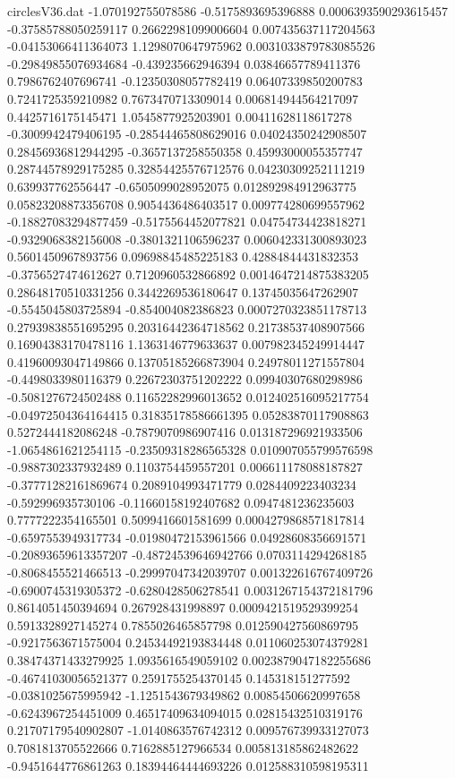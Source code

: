 \begin{filecontents}{circlesV36.dat}
-1.070192755078586	-0.5175893695396888	0.0006393590293615457
-0.37585788050259117	0.26622981099006604	0.007435637117204563
-0.04153066411364073	1.1298070647975962	0.0031033879783085526
-0.29849855076934684	-0.439235662946394	0.03846657789411376
0.7986762407696741	-0.12350308057782419	0.06407339850200783
0.7241725359210982	0.7673470713309014	0.006814944564217097
0.4425716175145471	1.0545877925203901	0.00411628118617278
-0.3009942479406195	-0.28544465808629016	0.04024350242908507
0.28456936812944295	-0.3657137258550358	0.45993000055357747
0.28744578929175285	0.32854425576712576	0.04230309252111219
0.639937762556447	-0.6505099028952075	0.012892984912963775
0.05823208873356708	0.9054436486403517	0.009774280699557962
-0.18827083294877459	-0.5175564452077821	0.04754734423818271
-0.9329068382156008	-0.3801321106596237	0.006042331300893023
0.5601450967893756	0.09698845485225183	0.42884844431832353
-0.3756527474612627	0.7120960532866892	0.0014647214875383205
0.28648170510331256	0.3442269536180647	0.13745035647262907
-0.5545045803725894	-0.854004082386823	0.0007270323851178713
0.27939838551695295	0.20316442364718562	0.21738537408907566
0.16904383170478116	1.1363146779633637	0.007982345249914447
0.41960093047149866	0.13705185266873904	0.24978011271557804
-0.4498033980116379	0.22672303751202222	0.09940307680298986
-0.5081276724502488	0.11652282996013652	0.012402516095217754
-0.04972504364164415	0.31835178586661395	0.05283870117908863
0.5272444182086248	-0.7879070986907416	0.013187296921933506
-1.0654861621254115	-0.23509318286565328	0.010907055799576598
-0.9887302337932489	0.1103754459557201	0.006611178088187827
-0.37771282161869674	0.2089104993471779	0.0284409223403234
-0.592996935730106	-0.11660158192407682	0.0947481236235603
0.7777222354165501	0.5099416601581699	0.0004279868571817814
-0.6597553949317734	-0.01980472153961566	0.04928608356691571
-0.20893659613357207	-0.48724539646942766	0.0703114294268185
-0.8068455521466513	-0.29997047342039707	0.001322616767409726
-0.6900745319305372	-0.6280428506278541	0.0031267154372181796
0.8614051450394694	0.267928431998897	0.0009421519529399254
0.5913328927145274	0.7855026465857798	0.012590427560869795
-0.9217563671575004	0.24534492193834448	0.011060253074379281
0.38474371433279925	1.0935616549059102	0.0023879047182255686
-0.46741030056521377	0.2591755254370145	0.145318151277592
-0.0381025675995942	-1.1251543679349862	0.00854506620997658
-0.6243967254451009	0.46517409634094015	0.02815432510319176
0.21707179540902807	-1.0140863576742312	0.009576739933127073
0.7081813705522666	0.7162885127966534	0.005813185862482622
-0.9451644776861263	0.18394464444693226	0.012588310598195311

\end{filecontents}
